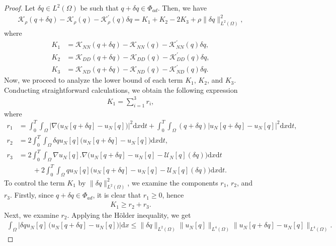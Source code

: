 \documentclass[a4paper,12pt,reqno,natbib]{amsart}
\newcommand{\dx} {\displaystyle\mathrm{d}x}
\newcommand{\dt} {\displaystyle\mathrm{d}t}
\begin{document}
\begin{proof}
    Let $\delta q\in L^2(\Omega)$ be such that $q+\delta q \in \Phi_{ad}$. Then, we have
\begin{align*} %
    \mathcal{K}_\rho(q+\delta q)-\mathcal{K}_\rho(q) -\mathcal{K}^\prime_\rho(q)\delta q=K_1+K_2-2K_3+ \rho\|\delta q\|^2_{L^2(\Omega)},
\end{align*}
where
\begin{align*}
   {K}_1&= \mathcal{K}_{NN}(q+\delta q)-\mathcal{K}_{NN}(q) -\mathcal{K}_{NN}^\prime(q)\delta q, \\
    {K}_2 &= \mathcal{K}_{DD}(q+\delta q)-\mathcal{K}_{DD}(q) -\mathcal{K}_{DD}^\prime(q)\delta q, \\
   {K}_3&=\mathcal{K}_{ND}(q+\delta q)-\mathcal{K}_{ND}(q) -\mathcal{K}_{ND}^\prime(q)\delta q.
\end{align*}
Now, we proceed to analyze the lower bound of each term $K_1$, $K_2$, and $K_3$. Conducting straightforward calculations, we obtain the following expression
\begin{align*}
    K_1 = \sum_{i=1}^3 r_i,
\end{align*}
where
\begin{align*} 
   r_1   &= \int_0^T\int_{\Omega} \Big|\nabla\Big( u_N[q+\delta q]- u_N[q]\Big)\Big|^2\dx\dt +\int_0^T\int_{\Omega} (q+\delta q)\Big| u_N[q+\delta q]- u_N[q]\Big|^2\dx\dt,\\
   r_2  &=2\int_0^T\int_{\Omega} \delta q u_N[q] \Big( u_N[q+\delta q]- u_N[q]\Big) \dx\dt,\\
    r_3&= 2\int_0^T\int_{\Omega} \nabla u_N[q] . \nabla\Big( u_N[q+\delta q]- u_N[q]-\mathcal{U}_N[q](\delta q)\Big) \dx\dt\\
    &\qquad + 2\int_0^T\int_{\Omega} q u_N[q] \Big( u_N[q+\delta q]- u_N[q]-\mathcal{U}_N[q](\delta q)\Big) \dx\dt.
\end{align*}
To control the term $K_1$ by $\|\delta q \|_{L^{2}(\Omega)}^2$, we examine the components $r_1$, $r_2$, and $r_3$. Firstly, since $q+\delta q \in \Phi_{ad}$, it is clear that $r_1\geq 0$, hence
\begin{align} \label{r_1}
    K_1\geq r_2+r_3.
\end{align}
Next, we examine $r_2$. Applying the H\"older inequality, we get
\begin{align*} 
\int_\Omega \Big|\delta q u_N[q]\, \Big( u_N[q+\delta q]- u_N[q]\Big)\Big|\dx\leq  \|\delta q \|_{L^{2}(\Omega)}\| u_N[q]\|_{L^{4}(\Omega)}\| u_N[q+\delta q]- u_N[q]\|_{L^{4}(\Omega)}.
\end{align*}

\end{proof}
\end{document}
